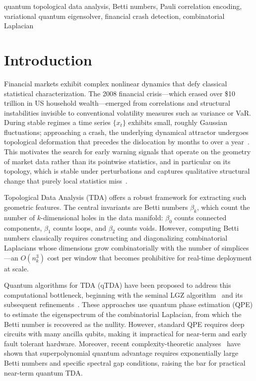 \documentclass[conference,10pt]{IEEEtran}
\begin{document}
\begin{IEEEkeywords}
quantum topological data analysis, Betti numbers, Pauli correlation encoding, variational quantum eigensolver, financial crash detection, combinatorial Laplacian
\end{IEEEkeywords}

\section{Introduction}

Financial markets exhibit complex nonlinear dynamics that defy classical
statistical characterization. The 2008 financial crisis---which erased
over \$10 trillion in US household wealth---emerged from correlations and
structural instabilities invisible to conventional volatility measures
such as variance or VaR\@. During stable regimes a time series $\{x_t\}$
exhibits small, roughly Gaussian fluctuations; approaching a crash, the
underlying dynamical attractor undergoes topological deformation that
precedes the dislocation by months to over a year~\cite{GK18}. This motivates
the search for early warning signals that operate on the geometry of
market data rather than its pointwise statistics, and in particular on
its topology, which is stable under perturbations and captures
qualitative structural change that purely local statistics
miss~\cite{Car09, EH10, Otter17}.

Topological Data Analysis (TDA) offers a robust framework for extracting
such geometric features. The central invariants are Betti numbers
$\beta_k$, which count the number of $k$-dimensional holes in the data
manifold: $\beta_0$ counts connected components, $\beta_1$ counts loops,
and $\beta_2$ counts voids. However, computing Betti numbers classically
requires constructing and diagonalizing combinatorial Laplacians whose
dimensions grow combinatorially with the number of simplices---an
$O(n_k^3)$ cost per window that becomes prohibitive for real-time
deployment at scale.

Quantum algorithms for TDA (qTDA) have been proposed to address this
computational bottleneck, beginning with the seminal LGZ
algorithm~\cite{lloyd2016quantum} and its subsequent
refinements~\cite{Ubaru21, McArdle22, Gyurik22, Hayakawa22, Akhalwaya22,
Berry24}. These approaches use quantum phase estimation (QPE) to
estimate the eigenspectrum of the combinatorial Laplacian, from which
the Betti number is recovered as the nullity. However, standard QPE
requires deep circuits with many ancilla qubits, making it impractical
for near-term and early fault tolerant hardware. Moreover, recent
complexity-theoretic analyses~\cite{CrichignoKohler24, Schmidhuber23, Berry24} have shown that
superpolynomial quantum advantage requires exponentially large Betti
numbers and specific spectral gap conditions, raising the bar for
practical near-term quantum TDA.
\end{document}
